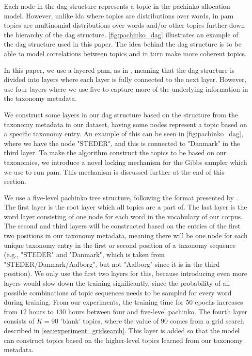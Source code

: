 Each node in the \gls{dag} structure represents a topic in the pachinko allocation model. 
However, unlike \gls{lda} where topics are distributions over words, in \gls{pam} topics are multinomial distributions over words and/or other topics further down the hierarchy of the \gls{dag} structure.
\autoref{fig:pachinko_dag} illustrates an example of the \gls{dag} structure used in this paper.
The idea behind the \gls{dag} structure is to be able to model correlations between topics and in turn make more coherent topics.
  
In this paper, we use a layered \gls{pam}, as in \cite{li2006pachinko}, meaning that the \gls{dag} structure is divided into layers where each layer is fully connected to the next layer.
However, \citet{li2006pachinko} use four layers where we use five to capture more of the underlying information in the taxonomy metadata.

We construct some layers in our \gls{dag} structure based on the structure from the taxonomy metadata in our dataset, having some nodes represent a topic based on a specific taxonomy entry.
An example of this can be seen in \autoref{fig:pachinko_dag}, where we have the node "STEDER", and this is connected to "Danmark" in the third layer.
To make the algorithm construct the topics to be based on our taxonomies, we introduce a novel locking mechanism for the Gibbs sampler which we use to run \gls{pam}.
This mechanism is discussed further at the end of this section.

We use a five-level pachinko tree structure, following the format presented by \citet{li2006pachinko}.
The first layer is the root layer which all topics are a part of.
The last layer is the word layer consisting of one node for each word in the vocabulary of our corpus.
The second and third layers will be constructed based on the entries of the first two positions in our taxonomy metadata, meaning there will be one node for each unique taxonomy entry in the first or second position of a taxonomy sequence (e.g., "STEDER" and "Danmark", which is taken from "STEDER/Danmark/Aalborg", but not "Aalborg" since it is in the third position).
We only use the first two layers for this, because introducing even more layers would slow down the training significantly, since the probability of all possible combinations of topic sequences needs to be sampled for every word during training.
From our experiments, the training time for $50$ epochs increases from $12$ hours to $130$ hours between four and five-level pachinko.
The fourth layer consists of $K = 90$ 'blank' topics, where the value of $90$ comes from a grid search described in \autoref{sec:experiment_gridsearch}.
This layer is added so that the model can construct topics based on the higher-level topics learned from our taxonomy metadata.

